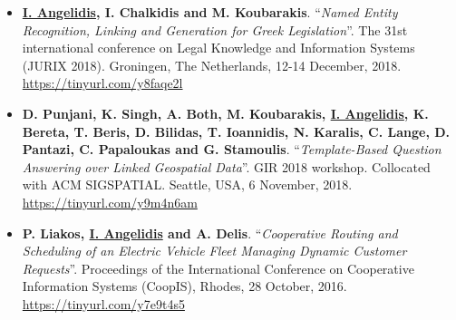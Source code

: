 \documentclass[a4paper,oneside,10pt]{article}
\begin{document}
\begin{itemize}
\item \textbf{\underline{I. Angelidis}, I. Chalkidis and M. Koubarakis}. ``\textit{Named Entity Recognition, Linking and Generation for Greek Legislation}''. The 31st international conference on Legal Knowledge and Information Systems (JURIX 2018). Groningen, The Netherlands, 12-14 December‚ 2018. \url{https://tinyurl.com/y8faqe2l}

\item \textbf{D. Punjani, K. Singh, A. Both, M. Koubarakis, \underline{I. Angelidis}, K. Bereta, T. Beris, D. Bilidas, T. Ioannidis, N. Karalis, C. Lange, D. Pantazi, C. Papaloukas and G. Stamoulis}. ``\textit{Template-Based Question Answering over Linked Geospatial Data}''. GIR 2018 workshop. Collocated with ACM SIGSPATIAL. Seattle, USA, 6 November, 2018. \url{https://tinyurl.com/y9m4n6am}

\item \textbf{P. Liakos, \underline{I. Angelidis} and A. Delis}. ``\textit{Cooperative Routing and Scheduling of an Electric Vehicle Fleet Managing Dynamic Customer Requests}''. Proceedings of the International Conference on Cooperative Information Systems (CoopIS), Rhodes, 28 October, 2016. \url{https://tinyurl.com/y7e9t4s5}

\end{itemize}
\end{document}
